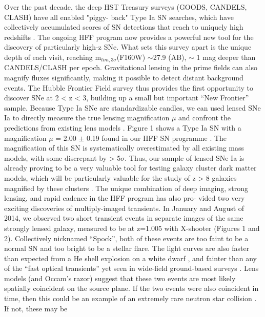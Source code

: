 Over the past decade, the deep HST Treasury surveys (GOODS, CANDELS, CLASH) have
all enabled "piggy- back" Type Ia SN searches, which have collectively
accumulated scores of SN detections that reach to uniquely high redshifts
\citep{Riess2007, Rodney2014b, Graur2014}.  
The ongoing HFF program now provides a powerful new tool for the discovery of
particularly high-z SNe. What sets this survey apart is the unique depth of each
visit, reaching m$_{lim,3\sigma}$(F160W) $\sim$27.9 (AB), $\sim$ 1 mag deeper
than CANDELS/CLASH per epoch. Gravitational lensing in the prime fields can also
magnify fluxes significantly, making it possible to detect distant background
events. 
The Hubble Frontier Field survey thus provides the first opportunity to discover
SNe at 2 < z < 3, building up a small but important “New Frontier” sample.
Because Type Ia SNe are standardizable candles, we can used lensed SNe Ia to
directly measure the true lensing magnification $\mu$ and confront the
predictions from existing lens models \citep[e.g.][]{Riehm2011, Li2012,
Patel2014}. Figure 1 shows a Type Ia SN with a magnification $\mu$ = 2.00 $\pm$
0.19 found in our HFF SN programme \citep{Rodney2015}. The magnification of this
SN is systematically overestimated by all existing mass models, with some
discrepant by > 5$\sigma$. Thus, our sample of lensed SNe Ia is already proving
to be a very valuable tool for testing galaxy cluster dark matter models, which
will be particularly valuable for the study of z > 8 galaxies magnified by these
clusters \citep[e.g.][]{Zheng2012}.
The unique combination of deep imaging, strong lensing, and rapid cadence in the
HFF program has also pro- vided two very exciting discoveries of multiply-imaged
transients. In January and August of 2014, we observed two short transient
events in separate images of the same strongly lensed galaxy, measured to be at
z=1.005 with X-shooter (Figures 1 and 2). Collectively nicknamed “Spock”, both
of these events are too faint to be a normal SN and too bright to be a stellar
flare. The light curves are also faster than expected from a He shell explosion
on a white dwarf \citep[a “.Ia” event][]{Bildsten2007}, and fainter than any of
the “fast optical transients” yet seen in wide-field ground-based surveys
\citep[e.g.][]{Kasliwal2010, Poznanski2010a, Vinko2014}.
Lens models (and Occam’s razor) suggest that these two events are most likely
spatially coincident on the source plane. If the two events were also coincident
in time, then this could be an example of an extremely rare neutron star
collision \citep[a “kilonova”][]{Tanvir2013, Barnes2013}. If not, these may be
